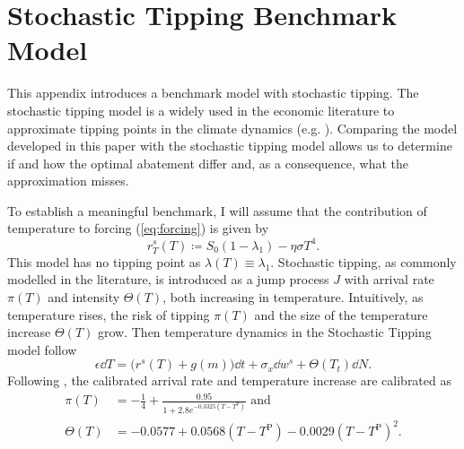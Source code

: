 \documentclass[../../main.tex]{subfiles}
\begin{document}
\section{Stochastic Tipping Benchmark Model} \label{appendix:benchmark}

This appendix introduces a benchmark model with stochastic tipping. The stochastic tipping model is a widely used in the economic literature to approximate tipping points in the climate dynamics (e.g. \citealt{hambel_optimal_2021}). Comparing the model developed in this paper with the stochastic tipping model allows us to determine if and how the optimal abatement differ and, as a consequence, what the approximation misses.

To establish a meaningful benchmark, I will assume that the contribution of temperature to forcing (\ref{eq:forcing}) is given by \begin{equation}
    r^{s}_T(T) \coloneqq S_0 (1 - \lambda_1) - \eta\sigma T^4.
\end{equation} This model has no tipping point as $\lambda(T) \equiv \lambda_1$. Stochastic tipping, as commonly modelled in the literature, is introduced  as a jump process $J$ with arrival rate $\pi(T)$ and intensity $\Theta(T)$, both increasing in temperature. Intuitively, as temperature rises, the risk of tipping $\pi(T)$ and the size of the temperature increase $\Theta(T)$ grow. Then temperature dynamics in the Stochastic Tipping model follow \begin{equation}
    \epsilon \dd{T} = \big(r^{s}(T)  + g(m) \big) \dd{t} + \sigma_x \dd{w}^{s} + \Theta(T_t) \dd{N}.
\end{equation} Following \cite{hambel_optimal_2021}, the calibrated arrival rate and temperature increase are calibrated as \begin{align}
    \pi(T) &=  -\frac{1}{4} + \frac{0.95}{1 + 2.8 e^{-0.3325 (T - T^{\mathrm{P}})}} \text{ and } \\
    \Theta(T) &= -0.0577 + 0.0568 (T - T^{\mathrm{P}})-0.0029(T - T^{\mathrm{P}})^2.
\end{align}
\end{document}
